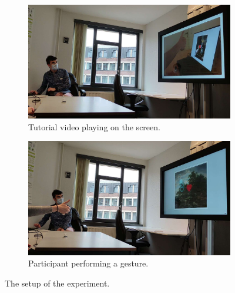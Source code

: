 \begin{figure}[htb]
    \centering
    \begin{subfigure}{.495\textwidth}
        \centering
        \includegraphics[width=\linewidth,trim={75 0 35 0},clip]{Figures/LUI/Evaluation/experiment-tutorial.pdf}
        \vspace{-14pt}
        \captionsetup{width=.9\linewidth}
        \caption{Tutorial video playing on the screen.}
        \label{fig:lui:evaluation-apparatus-tutorial}
    \end{subfigure}
    \begin{subfigure}{.495\textwidth}
        \centering
        \includegraphics[width=\linewidth,trim={80 0 30 0},clip]{Figures/LUI/Evaluation/experiment-gesture.pdf} 
        \vspace{-14pt}
        \captionsetup{width=.9\linewidth}
        \caption{Participant performing a gesture.}
        \label{fig:lui:evaluation-apparatus-gesture}
    \end{subfigure}
    \vspace{-18pt}
    \caption{The setup of the experiment.}
    \label{fig:lui:evaluation-apparatus}
\end{figure}

